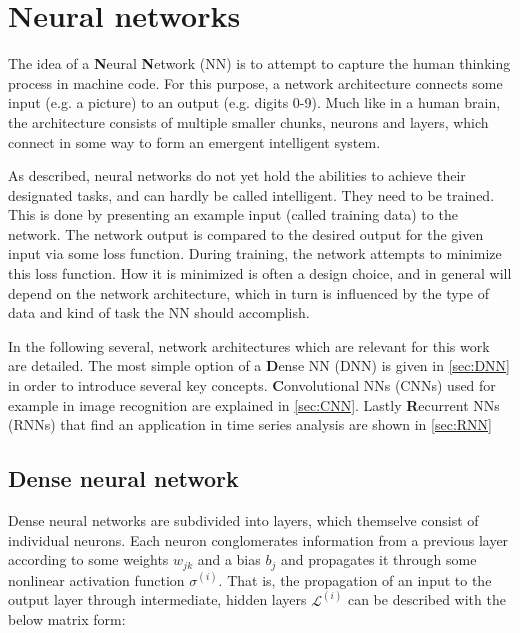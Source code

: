 
\chapter{Neural networks}
\label{chap:neural-networks}

The idea of a \textbf{N}eural \textbf{N}etwork (NN) is to attempt to capture the human thinking process in machine code. For this purpose, a network architecture
connects some input (e.g. a picture) to an output (e.g. digits 0-9). Much like in a human brain, the architecture consists of multiple smaller chunks, neurons 
and layers, which connect in some way to form an emergent intelligent system. 

As described, neural networks do not yet hold the abilities to achieve their designated tasks, and can hardly be called intelligent. They need to be trained. 
This is done by presenting an example input (called training data) to the network. The network output is compared to the desired output for the given input via 
some loss function. During training, the network attempts to minimize this loss function. How it is minimized is often a design choice, and in general will 
depend on the network architecture, which in turn is influenced by the type of data and kind of task the NN should accomplish.

In the following several, network architectures which are relevant for this work are detailed. The most simple option of a \textbf{D}ense NN (DNN) is given in 
\autoref{sec:DNN} in order to introduce several key concepts. \textbf{C}onvolutional NNs (CNNs) used for example in image recognition are explained in 
\autoref{sec:CNN}. Lastly \textbf{R}ecurrent NNs (RNNs) that find an application in time series analysis are shown in \autoref{sec:RNN}

\section{Dense neural network}
\label{sec:DNN}

Dense neural networks are subdivided into layers, which themselve consist of individual neurons. Each neuron conglomerates information from a previous layer 
according to some weights $w_{jk}$ and a bias $b_j$ and propagates it through some nonlinear activation function $\sigma^{(i)}$. That is, the propagation of 
an input to the output layer through intermediate, hidden layers $\mathcal{L}^{(i)}$ can be described with the below matrix form:

